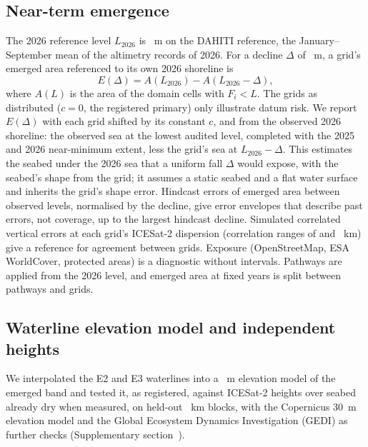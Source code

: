\subsection{Near-term emergence}
The 2026 reference level $L_{2026}$ is ~m on the DAHITI reference, the January--September mean of the  altimetry records of 2026. For a decline $\Delta$ of ~m, a grid's emerged area referenced to its own 2026 shoreline is
\begin{equation}
  E(\Delta) = A(L_{2026}) - A(L_{2026} - \Delta) ,
  \label{eq:emerged}
\end{equation}
where $A(L)$ is the area of the domain cells with $F_i < L$. The grids as distributed ($c = 0$, the registered primary) only illustrate datum risk. We report $E(\Delta)$ with each grid shifted by its constant $c$, and from the observed 2026 shoreline: the observed sea at the lowest audited level, completed with the 2025 and 2026 near-minimum extent, less the grid's sea at $L_{2026} - \Delta$. This estimates the seabed under the 2026 sea that a uniform fall $\Delta$ would expose, with the seabed's shape from the grid; it assumes a static seabed and a flat water surface and inherits the grid's shape error. Hindcast errors of emerged area between observed levels, normalised by the decline, give error envelopes that describe past errors, not coverage, up to the largest hindcast decline. Simulated correlated vertical errors at each grid's ICESat-2 dispersion (correlation ranges of  and ~km) give a reference for agreement between grids. Exposure (OpenStreetMap\citep{osm}, ESA WorldCover\citep{worldcover2021}, protected areas\citep{wdpa}) is a diagnostic without intervals. Pathways\citep{samant2023,hoseini2025} are applied from the 2026 level, and emerged area at fixed years is split between pathways and grids.

\subsection{Waterline elevation model and independent heights}
We interpolated the E2 and E3 waterlines into a ~m elevation model of the emerged band and tested it, as registered, against ICESat-2 heights\citep{atl06_v7,atl08_v7,markus2017} over seabed already dry when measured, on held-out ~km blocks, with the Copernicus 30~m elevation model\citep{copdem,copdem_handbook_i5} and the Global Ecosystem Dynamics Investigation (GEDI)\citep{gedi_l2a_v2} as further checks (Supplementary section~\SIdem).

